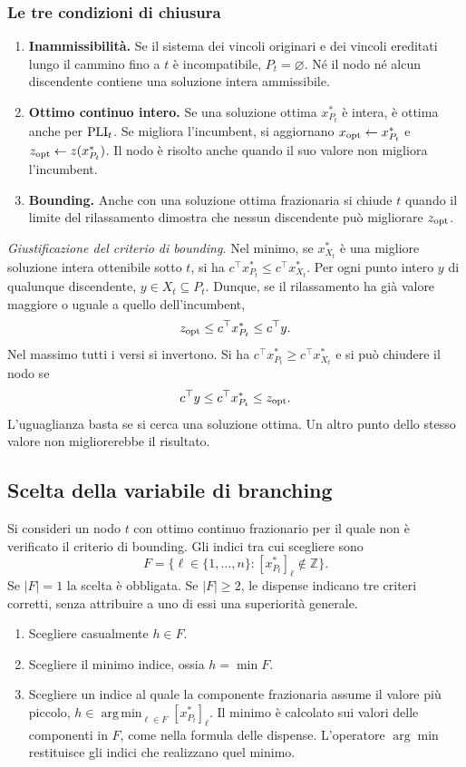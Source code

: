 \subsubsection{Le tre condizioni di chiusura}

\begin{enumerate}
 \item \textbf{Inammissibilità.} Se il sistema dei vincoli originari
 e dei vincoli ereditati lungo il cammino fino a $t$ è incompatibile,
 $P_t=\varnothing$. Né il nodo né alcun discendente contiene una soluzione
 intera ammissibile.
 \item \textbf{Ottimo continuo intero.} Se una soluzione ottima
 $x^*_{P_t}$ è intera, è ottima anche per $\mathrm{PLI}_{t}$. Se migliora
 l'incumbent, si aggiornano $x_{\mathrm{opt}}\gets x^*_{P_t}$ e
 $z_{\mathrm{opt}}\gets z(x^*_{P_t})$. Il nodo è risolto anche quando il suo
 valore non migliora l'incumbent.
 \item \textbf{Bounding.} Anche con una soluzione ottima frazionaria si
 chiude $t$ quando il limite del rilassamento dimostra che nessun
 discendente può migliorare $z_{\mathrm{opt}}$.
\end{enumerate}

\emph{Giustificazione del criterio di bounding.}
Nel minimo, se $x^*_{X_t}$ è una migliore soluzione intera ottenibile
sotto $t$, si ha $c^\top x^*_{P_t}\leq c^\top x^*_{X_t}$.
Per ogni punto intero $y$ di qualunque discendente, $y\in X_t\subseteq P_t$.
Dunque, se il rilassamento ha già valore maggiore o uguale a quello
dell'incumbent,
\[
 z_{\mathrm{opt}}\leq c^\top x^*_{P_t}\leq c^\top y.
\]
Nel massimo tutti i versi si invertono. Si ha
$c^\top x^*_{P_t}\geq c^\top x^*_{X_t}$ e si può chiudere il nodo se
\[
 c^\top y\leq c^\top x^*_{P_t}\leq z_{\mathrm{opt}}.
\]
L'uguaglianza basta se si cerca una soluzione ottima. Un altro punto
dello stesso valore non migliorerebbe il risultato.

\subsection{Scelta della variabile di branching}

Si consideri un nodo $t$ con ottimo continuo frazionario per il quale
non è verificato il criterio di bounding. Gli indici tra cui scegliere sono
\[
 F=\{\ell\in\{1,\dots,n\}:[x^*_{P_t}]_\ell\notin\mathbb Z\}.
\]
Se $|F|=1$ la scelta è obbligata. Se $|F|\geq2$, le dispense indicano
tre criteri corretti, senza attribuire a uno di essi una superiorità generale.
\begin{enumerate}
 \item Scegliere casualmente $h\in F$.
 \item Scegliere il minimo indice, ossia $h=\min F$.
 \item Scegliere un indice al quale la componente frazionaria assume il
       valore più piccolo,
       $h\in\operatorname*{arg\,min}_{\ell\in F}[x^*_{P_t}]_\ell$.
       Il minimo è calcolato sui valori delle componenti in $F$, come
       nella formula delle dispense. L'operatore $\arg\min$ restituisce
       gli indici che realizzano quel minimo.
\end{enumerate}

